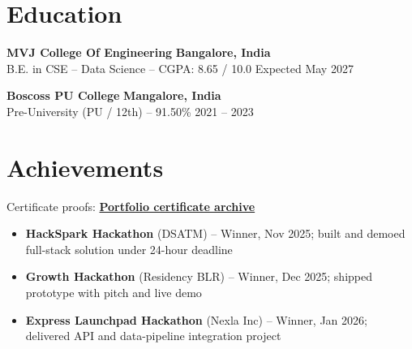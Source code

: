 \documentclass[9pt,letterpaper]{article}
\newcommand{\resumeSubheading}[4]{%
  \vspace{1pt}%
  \textbf{#1} \hfill {\bfseries #2}\\[2pt]
  {#3} \hfill {\color{muted}\small #4}\par\vspace{1pt}%
}
\newcommand{\resumeItem}{\item}
\newcommand{\resumelink}[2]{\href{#1}{\textbf{#2}}}
\begin{document}
\section{Education}
\resumeSubheading
  {MVJ College Of Engineering}{Bangalore, India}
  {B.E. in CSE -- Data Science -- CGPA: 8.65 / 10.0}{Expected May 2027}

\resumeSubheading
  {Boscoss PU College}{Mangalore, India}
  {Pre-University (PU / 12th) -- 91.50\%}{2021 -- 2023}

\section{Achievements}
\small Certificate proofs: \resumelink{http://shashankva.me/}{Portfolio certificate archive}\normalsize
\begin{itemize}[leftmargin=*, nosep, topsep=1pt, itemsep=0pt]
  \resumeItem{\textbf{HackSpark Hackathon} (DSATM) -- Winner, Nov 2025; built and demoed full-stack solution under 24-hour deadline}
  \resumeItem{\textbf{Growth Hackathon} (Residency BLR) -- Winner, Dec 2025; shipped prototype with pitch and live demo}
  \resumeItem{\textbf{Express Launchpad Hackathon} (Nexla Inc) -- Winner, Jan 2026; delivered API and data-pipeline integration project}
\end{itemize}
\end{document}

